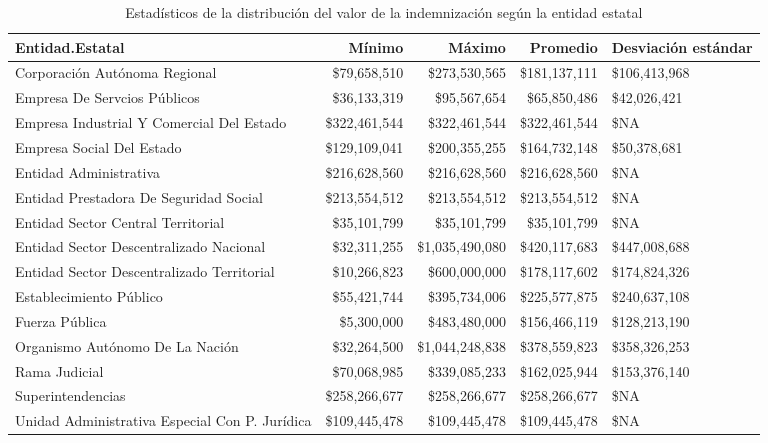 \begin{sidewaystable}[htbp]
\centering
\caption{Estadísticos de la distribución del
valor de la indemnización según la entidad estatal} 
\label{tab:indemnizacion-entidad}
\begin{tabular}{lrrrR{2cm}}
  \hline
Entidad.Estatal & Mínimo & Máximo & Promedio & Desviación estándar \\ 
  \hline
Corporación Autónoma Regional & \$79,658,510 & \$273,530,565 & \$181,137,111 & \$106,413,968 \\ 
  Empresa De Servcios Públicos & \$36,133,319 & \$95,567,654 & \$65,850,486 & \$42,026,421 \\ 
  Empresa Industrial Y Comercial Del Estado & \$322,461,544 & \$322,461,544 & \$322,461,544 & \$NA \\ 
  Empresa Social Del Estado & \$129,109,041 & \$200,355,255 & \$164,732,148 & \$50,378,681 \\ 
  Entidad Administrativa & \$216,628,560 & \$216,628,560 & \$216,628,560 & \$NA \\ 
  Entidad Prestadora De Seguridad Social & \$213,554,512 & \$213,554,512 & \$213,554,512 & \$NA \\ 
  Entidad Sector Central Territorial & \$35,101,799 & \$35,101,799 & \$35,101,799 & \$NA \\ 
  Entidad Sector Descentralizado Nacional & \$32,311,255 & \$1,035,490,080 & \$420,117,683 & \$447,008,688 \\ 
  Entidad Sector Descentralizado Territorial & \$10,266,823 & \$600,000,000 & \$178,117,602 & \$174,824,326 \\ 
  Establecimiento Público & \$55,421,744 & \$395,734,006 & \$225,577,875 & \$240,637,108 \\ 
  Fuerza Pública & \$5,300,000 & \$483,480,000 & \$156,466,119 & \$128,213,190 \\ 
  Organismo Autónomo De La Nación & \$32,264,500 & \$1,044,248,838 & \$378,559,823 & \$358,326,253 \\ 
  Rama Judicial & \$70,068,985 & \$339,085,233 & \$162,025,944 & \$153,376,140 \\ 
  Superintendencias & \$258,266,677 & \$258,266,677 & \$258,266,677 & \$NA \\ 
  Unidad Administrativa Especial Con P. Jurídica & \$109,445,478 & \$109,445,478 & \$109,445,478 & \$NA \\ 
   \hline
\end{tabular}
\end{sidewaystable}
